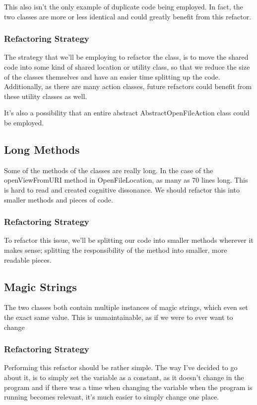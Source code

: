 This also isn't the only example of duplicate code being employed. In fact, the two classes are more or less identical and could greatly benefit from this refactor.

\subsubsection{Refactoring Strategy}
The strategy that we'll be employing to refactor the class, is to move the shared code into some kind of shared location or utility class, so that we reduce the size of the classes themselves and have an easier time splitting up the code. Additionally, as there are many action classes, future refactors could benefit from these utility classes as well.

It's also a possibility that an entire abstract AbstractOpenFileAction class could be employed.


\subsection{Long Methods}
Some of the methods of the classes are really long. In the case of the openViewFromURI method in OpenFileLocation, as many as 70 lines long. This is hard to read and created cognitive dissonance. We should refactor this into smaller methods and pieces of code.

\subsubsection{Refactoring Strategy}
To refactor this issue, we'll be splitting our code into smaller methods wherever it makes sense; splitting the responsibility of the method into smaller, more readable pieces.

\subsection{Magic Strings}
The two classes both contain multiple instances of magic strings, which even set the exact same value. This is unmaintainable, as if we were to ever want to change

\subsubsection{Refactoring Strategy}
Performing this refactor should be rather simple. The way I've decided to go about it, is to simply set the variable as a constant, as it doesn't change in the program and if there was a time when changing the variable when the program is running becomes relevant, it's much easier to simply change one place.

